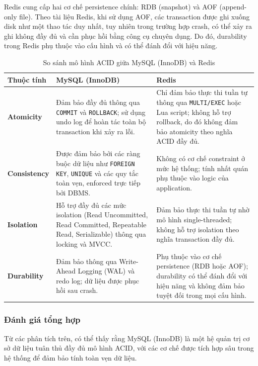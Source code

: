 Redis cung cấp hai cơ chế persistence chính: RDB (snapshot) và AOF (append-only file). Theo tài liệu Redis, khi sử dụng AOF, các transaction được ghi xuống disk như một thao tác duy nhất, tuy nhiên trong trường hợp crash, có thể xảy ra ghi không đầy đủ và cần phục hồi bằng công cụ chuyên dụng. Do đó, durability trong Redis phụ thuộc vào cấu hình và có thể đánh đổi với hiệu năng.
\begin{table}[H]
\centering
\caption{So sánh mô hình ACID giữa MySQL (InnoDB) và Redis}
\begin{tabular}{|l|p{5.5cm}|p{5.5cm}|}
\hline
\textbf{Thuộc tính} & \textbf{MySQL (InnoDB)} & \textbf{Redis} \\
\hline

\textbf{Atomicity} 
& Đảm bảo đầy đủ thông qua \texttt{COMMIT} và \texttt{ROLLBACK}; sử dụng undo log để hoàn tác toàn bộ transaction khi xảy ra lỗi. 
& Chỉ đảm bảo thực thi tuần tự thông qua \texttt{MULTI/EXEC} hoặc Lua script; không hỗ trợ rollback, do đó không đảm bảo atomicity theo nghĩa ACID đầy đủ. \\
\hline

\textbf{Consistency} 
& Được đảm bảo bởi các ràng buộc dữ liệu như \texttt{FOREIGN KEY}, \texttt{UNIQUE} và các quy tắc toàn vẹn, enforced trực tiếp bởi DBMS. 
& Không có cơ chế constraint ở mức hệ thống; tính nhất quán phụ thuộc vào logic của application. \\
\hline

\textbf{Isolation} 
& Hỗ trợ đầy đủ các mức isolation (Read Uncommitted, Read Committed, Repeatable Read, Serializable) thông qua locking và MVCC. 
& Đảm bảo thực thi tuần tự nhờ mô hình single-threaded; không hỗ trợ isolation theo nghĩa transaction đầy đủ. \\
\hline

\textbf{Durability} 
& Đảm bảo thông qua Write-Ahead Logging (WAL) và redo log; dữ liệu được phục hồi sau crash. 
& Phụ thuộc vào cơ chế persistence (RDB hoặc AOF); durability có thể đánh đổi với hiệu năng và không đảm bảo tuyệt đối trong mọi cấu hình. \\
\hline

\end{tabular}
\end{table}
\subsubsection{Đánh giá tổng hợp}

Từ các phân tích trên, có thể thấy rằng MySQL (InnoDB) là một hệ quản trị cơ sở dữ liệu tuân thủ đầy đủ mô hình ACID, với các cơ chế được tích hợp sâu trong hệ thống để đảm bảo tính toàn vẹn dữ liệu.


